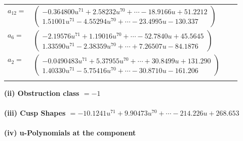 \documentclass[1p]{elsarticle_modified}
\theoremstyle{definition}
\begin{document}
\begin{tabular}{m{7pt} m{180pt} m{7pt} m{180pt} }
\flushright $a_{12}=$&$\begin{pmatrix}-0.364800 u^{71}+2.58232 u^{70}+\cdots-18.9166 u+51.2212\\1.51001 u^{71}-4.55294 u^{70}+\cdots-23.4995 u-130.337\end{pmatrix}$ \\
\flushright $a_{6}=$&$\begin{pmatrix}-2.19576 u^{71}+1.19016 u^{70}+\cdots-52.7840 u+45.5645\\1.33590 u^{71}-2.38359 u^{70}+\cdots+7.26507 u-84.1876\end{pmatrix}$ \\
\flushright $a_{2}=$&$\begin{pmatrix}-0.0490483 u^{71}+5.37955 u^{70}+\cdots+30.8499 u+131.290\\1.40330 u^{71}-5.75416 u^{70}+\cdots-30.8710 u-161.206\end{pmatrix}$\\&\end{tabular}
\flushleft \textbf{(ii) Obstruction class $= -1$}\\~\\
\flushleft \textbf{(iii) Cusp Shapes $= -10.1241 u^{71}+9.90473 u^{70}+\cdots-214.226 u+268.653$}\\~\\
\newpage\renewcommand{\arraystretch}{1}
\flushleft \textbf{(iv) u-Polynomials at the component}\newline \\
\end{document}
